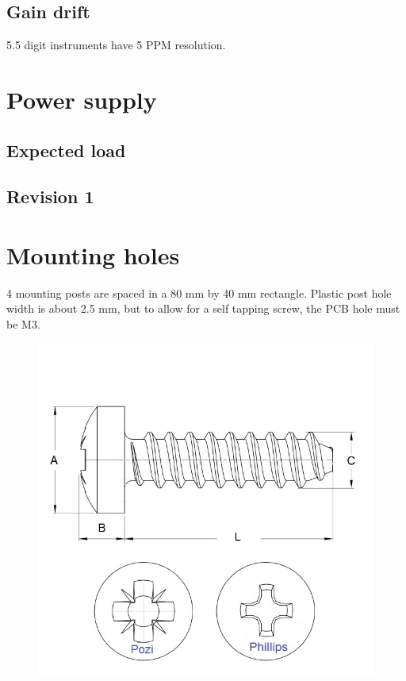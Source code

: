 \documentclass[11pt]{article}
\begin{document}
\subsection{Gain drift}
5.5 digit instruments have 5 PPM resolution.

\pagebreak
\section{Power supply}

\subsection{Expected load}
\subsection{Revision 1}



\section{Mounting holes}
4 mounting posts are spaced in a 80 mm by 40 mm rectangle. Plastic post 
hole width is about 2.5 mm, but to allow for a self tapping screw, the PCB 
hole must be M3.

\begin{figure}[H]
  \centering 
  \includegraphics[scale=0.4]{"./figs/screw_sizez.jpg"}
\end{figure}
\end{document}
